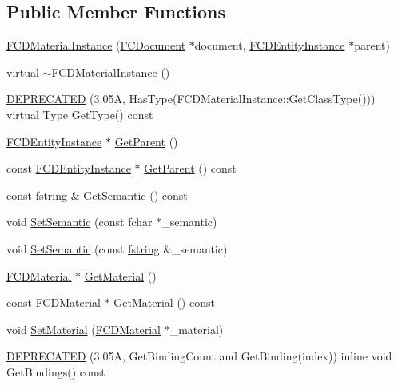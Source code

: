 \subsection*{Public Member Functions}
\begin{DoxyCompactItemize}
\item 
\hyperlink{classFCDMaterialInstance_aeead20fe8adce58d86d40b4c026a6c01}{FCDMaterialInstance} (\hyperlink{classFCDocument}{FCDocument} $\ast$document, \hyperlink{classFCDEntityInstance}{FCDEntityInstance} $\ast$parent)
\item 
virtual \hyperlink{classFCDMaterialInstance_a19ef000f5b34ee9d4fe7688a4e4b17af}{$\sim$FCDMaterialInstance} ()
\item 
\hyperlink{classFCDMaterialInstance_a43aeb69d042dcf821de74a63b2ef0e1d}{DEPRECATED} (3.05A, HasType(FCDMaterialInstance::GetClassType())) virtual Type GetType() const 
\item 
\hyperlink{classFCDEntityInstance}{FCDEntityInstance} $\ast$ \hyperlink{classFCDMaterialInstance_a84d82c5789d224a2112e076fc730943c}{GetParent} ()
\item 
const \hyperlink{classFCDEntityInstance}{FCDEntityInstance} $\ast$ \hyperlink{classFCDMaterialInstance_aae8d59b1e623f5b85b3dfc8c5aeaa58e}{GetParent} () const 
\item 
const \hyperlink{classfm_1_1stringT}{fstring} \& \hyperlink{classFCDMaterialInstance_afb39d26ab1e0eaedcedb9ec7be0ba492}{GetSemantic} () const 
\item 
void \hyperlink{classFCDMaterialInstance_a8b74872facbef6ce4de3c3eea3ed524a}{SetSemantic} (const fchar $\ast$\_\-semantic)
\item 
void \hyperlink{classFCDMaterialInstance_a7a1930462c50ff340e40f60fc1642ebd}{SetSemantic} (const \hyperlink{classfm_1_1stringT}{fstring} \&\_\-semantic)
\item 
\hyperlink{classFCDMaterial}{FCDMaterial} $\ast$ \hyperlink{classFCDMaterialInstance_a190f2bb81d391892a0edc501c682bba7}{GetMaterial} ()
\item 
const \hyperlink{classFCDMaterial}{FCDMaterial} $\ast$ \hyperlink{classFCDMaterialInstance_a8dd52145748ea4424bd6d5ce67ce4110}{GetMaterial} () const 
\item 
void \hyperlink{classFCDMaterialInstance_ade599811f26176190f8174d50bacb2b7}{SetMaterial} (\hyperlink{classFCDMaterial}{FCDMaterial} $\ast$\_\-material)
\item 
\hyperlink{classFCDMaterialInstance_ac6ed7f1448b38726d9bd293e30cda6bb}{DEPRECATED} (3.05A, GetBindingCount and GetBinding(index)) inline void GetBindings() const 

\end{DoxyCompactItemize}
